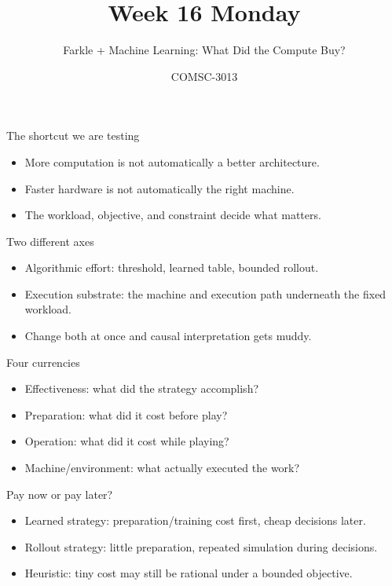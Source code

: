 \documentclass{beamer}
\title{Week 16 Monday}
\subtitle{Farkle + Machine Learning: What Did the Compute Buy?}
\author{COMSC-3013}
\date{}
\begin{document}
\begin{frame}\titlepage\end{frame}

\begin{frame}{The shortcut we are testing}
\begin{itemize}
\item More computation is not automatically a better architecture.
\item Faster hardware is not automatically the right machine.
\item The workload, objective, and constraint decide what matters.
\end{itemize}
\end{frame}

\begin{frame}{Two different axes}
\begin{itemize}
\item Algorithmic effort: threshold, learned table, bounded rollout.
\item Execution substrate: the machine and execution path underneath the fixed workload.
\item Change both at once and causal interpretation gets muddy.
\end{itemize}
\end{frame}

\begin{frame}{Four currencies}
\begin{itemize}
\item Effectiveness: what did the strategy accomplish?
\item Preparation: what did it cost before play?
\item Operation: what did it cost while playing?
\item Machine/environment: what actually executed the work?
\end{itemize}
\end{frame}

\begin{frame}{Pay now or pay later?}
\begin{itemize}
\item Learned strategy: preparation/training cost first, cheap decisions later.
\item Rollout strategy: little preparation, repeated simulation during decisions.
\item Heuristic: tiny cost may still be rational under a bounded objective.
\end{itemize}
\end{frame}
\end{document}
